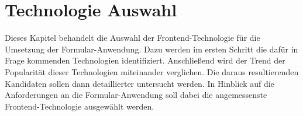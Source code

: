 \section{Technologie Auswahl}

Dieses Kapitel behandelt die Auswahl der Frontend-Technologie für die Umsetzung der Formular-Anwendung.
Dazu  werden im ersten Schritt die dafür in Frage kommenden Technologien identifiziert.
 Anschließend wird der Trend der Popularität dieser Technologien miteinander verglichen.
Die daraus resultierenden Kandidaten sollen dann  detaillierter untersucht werden.
In Hinblick auf die Anforderungen an die Formular-Anwendung soll dabei die angemessenste Frontend-Technologie ausgewählt werden.



